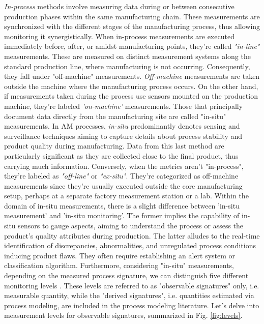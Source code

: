 \emph{In-process} methods involve measuring data during or between consecutive production phases within the same manufacturing chain. These measurements are synchronized with the different stages of the manufacturing process, thus allowing monitoring it synergistically. When in-process measurements are executed immediately before, after, or amidst manufacturing points, they're called \emph{"in-line"} measurements. These are measured on distinct measurement systems along the standard production line, where manufacturing is not occurring. Consequently, they fall under "off-machine" measurements. \emph{Off-machine} measurements are taken outside the machine where the manufacturing process occurs. On the other hand, if measurements taken during the process use sensors mounted on the production machine, they're labeled \emph{'on-machine'} measurements. Those that principally document data directly from the manufacturing site are called "in-situ" measurements. In AM processes, \emph{in-situ} predominantly denotes sensing and surveillance techniques aiming to capture details about process stability and product quality during manufacturing. Data from this last method are particularly significant as they are collected close to the final product, thus carrying much information. Conversely, when the metrics aren't "in-process", they're labeled as \emph{"off-line"} or \emph{"ex-situ"}. They're categorized as off-machine measurements since they're usually executed outside the core manufacturing setup, perhaps at a separate factory measurement station or a lab. Within the domain of in-situ measurements, there is a slight difference between 'in-situ measurement' and 'in-situ monitoring'. The former implies the capability of in-situ sensors to gauge aspects, aiming to understand the process or assess the product's quality attributes during production. The latter alludes to the real-time identification of discrepancies, abnormalities, and unregulated process conditions inducing product flaws. They often require establishing an alert system or classification algorithm. Furthermore, considering "in-situ" measurements, depending on the measured process signature, we can distinguish five different monitoring levels \cite{grasso_-situ_2021, grasso_process_2017}. These levels are referred to as "observable signatures" only, i.e. measurable quantity, while the "derived signatures", i.e. quantities estimated via process modeling, are included in the process modeling literature. Let's delve into measurement levels for observable signatures, summarized in Fig. \ref{fig:levels}.
